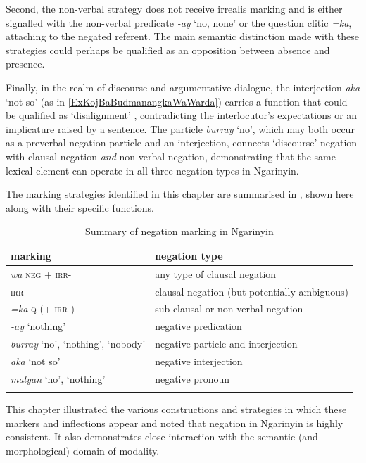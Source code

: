 \documentclass[output=paper,colorlinks,citecolor=brown]{langscibook}
\begin{document}
Second, the non-verbal strategy does not receive irrealis marking and is either signalled with the non-verbal predicate \textit{-ay} `no, none' or the question clitic \textit{=ka}, attaching to the negated referent. The main semantic distinction made with these strategies could perhaps be qualified as an opposition between absence and presence.

Finally, in the realm of discourse and argumentative dialogue, the interjection \textit{aka} `not so' (as in \ref{ExKojBaBudmanangkaWaWarda}) carries a function that could be qualified as `disalignment' \citep{DuBois2007}, contradicting the interlocutor's expectations or an implicature raised by a sentence. The particle \textit{burray} `no', which may both occur as a preverbal negation particle and an interjection, connects `discourse' negation with clausal negation \textit{and} non-verbal negation, demonstrating that the same lexical element can operate in all three negation types in Ngarinyin.

The marking strategies identified in this chapter are summarised in , shown here along with their specific functions.

\begin{table}
\centering
    \begin{tabularx}{\textwidth}{ll}
    \lsptoprule
    {marking} & {negation type} \\
    \midrule 
    \textit{wa} \textsc{neg} + \textsc{irr}- & any type of clausal negation \\
    \textsc{irr}- & clausal negation (but potentially ambiguous) \\
    \textit{=ka} \textsc{q} (+ \textsc{irr}-) & sub-clausal or non-verbal negation \\
    \textit{-ay} `nothing' & negative predication \\
    \textit{burray} `no', `nothing', `nobody' & negative particle and interjection \\
    \textit{aka} `not so' & negative interjection \\
    \textit{malyan} `no', `nothing' & negative pronoun \\
    \lspbottomrule
    \end{tabularx}
\caption{Summary of negation marking in Ngarinyin} \label{TabSummary}
\end{table}

This chapter illustrated the various constructions and strategies in which these markers and inflections appear and noted that negation in Ngarinyin is highly consistent. It also demonstrates close interaction with the semantic (and morphological) domain of modality.
\end{document}
